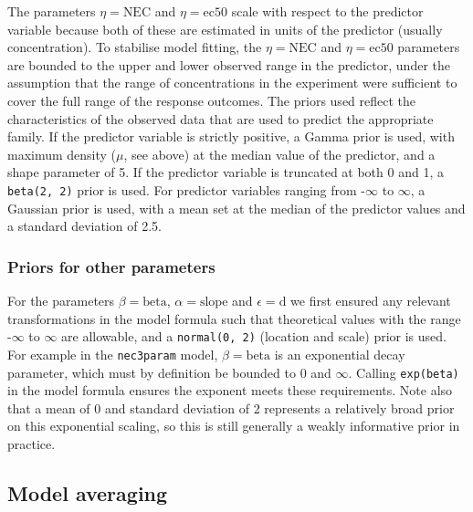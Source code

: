 The parameters \(\eta = \text{NEC}\) and \(\eta = \text{ec50}\) scale
with respect to the predictor variable because both of these are
estimated in units of the predictor (usually concentration). To
stabilise model fitting, the \(\eta = \text{NEC}\) and
\(\eta = \text{ec50}\) parameters are bounded to the upper and lower
observed range in the predictor, under the assumption that the range of
concentrations in the experiment were sufficient to cover the full range
of the response outcomes. The priors used reflect the characteristics of
the observed data that are used to predict the appropriate family. If
the predictor variable is strictly positive, a Gamma prior is used, with
maximum density (\(\mu\), see above) at the median value of the
predictor, and a shape parameter of 5. If the predictor variable is
truncated at both 0 and 1, a \texttt{beta(2,\ 2)} prior is used. For
predictor variables ranging from -\(\infty\) to \(\infty\), a Gaussian
prior is used, with a mean set at the median of the predictor values and
a standard deviation of 2.5.

\hypertarget{priors-for-other-parameters}{%
\subsubsection{Priors for other
parameters}\label{priors-for-other-parameters}}

For the parameters \(\beta = \text{beta}\), \(\alpha = \text{slope}\)
and \(\epsilon = \text{d}\) we first ensured any relevant
transformations in the model formula such that theoretical values with
the range -\(\infty\) to \(\infty\) are allowable, and a
\texttt{normal(0,\ 2)} (location and scale) prior is used. For example
in the \texttt{nec3param} model, \(\beta = \text{beta}\) is an
exponential decay parameter, which must by definition be bounded to 0
and \(\infty\). Calling \texttt{exp(beta)} in the model formula ensures
the exponent meets these requirements. Note also that a mean of 0 and
standard deviation of 2 represents a relatively broad prior on this
exponential scaling, so this is still generally a weakly informative
prior in practice.

\hypertarget{modavg}{%
\subsection{Model averaging}\label{modavg}}

